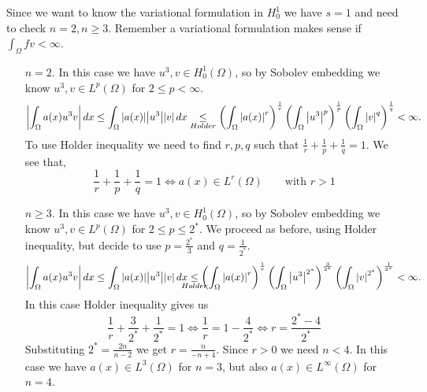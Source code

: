 Since we want to know the variational formulation in \(H^1_0\) we have \(s = 1\) and need to check \(n = 2, n \geq 3\). Remember a variational formulation makes sense if \(\int_\Omega fv < \infty\).
\begin{itemize}
    \item[\(n = 2\).] In this case we have \(u^3, v \in H^1_0(\Omega)\), so by Sobolev embedding we know \(u^3, v \in L^p(\Omega)\) for \(2 \leq p < \infty\). 
    \[
        \abs{\int_\Omega a(x) u^3 v}  \, dx \leq \int_\Omega \abs{a(x)} \abs{u^3} \abs{v} \, dx \underset{Holder}{\leq} \left(\int_\Omega \abs{a(x)}^r\right)^{\frac{1}{r}} \left(\int_\Omega \abs{u^3}^p \right)^{\frac{1}{p}} \left(\int_\Omega \abs{v}^q \right)^{\frac{1}{q}} < \infty.
    \]
    To use Holder inequality we need to find \(r, p, q\) such that \(\frac{1}{r} + \frac{1}{p} + \frac{1}{q} = 1\). We see that, 
    \[
        \frac{1}{r} + \frac{1}{p} + \frac{1}{q} = 1 \iff a(x) \in L^r(\Omega) \qquad \text{with } r > 1
    \]
    \item[\(n \geq 3\).] In this case we have \(u^3, v \in H^1_0(\Omega)\), so by Sobolev embedding we know \(u^3, v \in L^p(\Omega)\) for \(2 \leq p \leq 2^*\).
    We proceed as before, using Holder inequality, but decide to use \(p = \frac{2^*}{3}\) and \(q = \frac{1}{2^*}.\)
    \[
        \abs{\int_\Omega a(x) u^3 v}  \, dx \leq \int_\Omega \abs{a(x)} \abs{u^3} \abs{v} \, dx \underset{\mathclap{Holder}}{\leq} \left(\int_\Omega \abs{a(x)}^r\right)^{\frac{1}{r}} \left(\int_\Omega \abs{u^3}^{2^*} \right)^{\frac{3}{2^*}} \left(\int_\Omega \abs{v}^{2^*} \right)^{\frac{1}{2^*}} < \infty.
    \]
    In this case Holder inequality gives us 
    \[
        \frac{1}{r} + \frac{3}{2^*} + \frac{1}{2^*} = 1 \iff \frac{1}{r} = 1 - \frac{4}{2^*} \iff r = \frac{2^* - 4}{2^*}
    \]
    Substituting \(2^* = \frac{2n}{n - 2}\) we get \(r = \frac{n}{-n + 4}\). Since \(r > 0\) we need \(n < 4\).
    In this case we have \(a(x) \in L^3(\Omega)\) for \(n = 3\), but also \(a(x) \in L^\infty(\Omega)\) for \(n = 4\).
\end{itemize}

